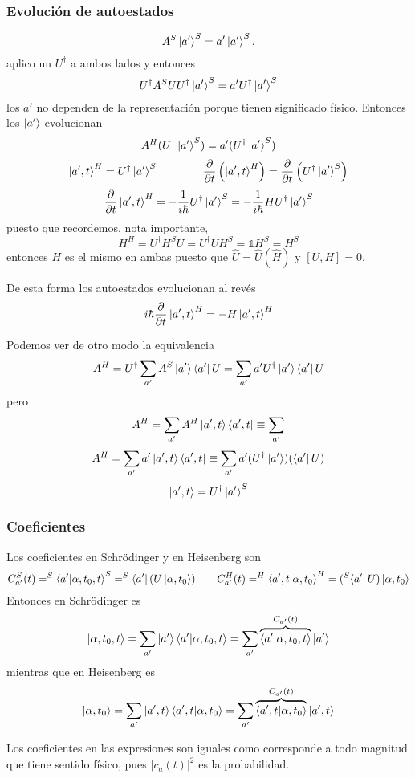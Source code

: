 \documentclass[10pt,oneside]{CBFT_book}
\begin{document}
\subsubsection{Evolución de autoestados}

\[
	A^S \Ket{a'}^S = a' \Ket{a'}^S,
\]
aplico un $U^\dagger$ a ambos lados y entonces 
\[
	U^\dagger A^S UU^\dagger \Ket{a'}^S = a' U^\dagger \Ket{a'}^S
\]
los $a'$ no dependen de la representación porque tienen significado físico. Entonces los $\Ket{a'}$ evolucionan
\[
	A^H (U^\dagger\Ket{a'}^S) = a' (U^\dagger\Ket{a'}^S)
\]
\[
	\Ket{a',t}^H = U^\dagger \Ket{a'}^S \qquad \qquad \frac{\partial^{\hspace{-0.05em}} {}}{\partial {t}^{\hspace{-0.05em}}}\left( \Ket{a',t}^H \right) = 
	\frac{\partial^{\hspace{-0.05em}} {}}{\partial {t}^{\hspace{-0.05em}}} \left( U^\dagger \Ket{a'}^S \right)
\]
\[
	\frac{\partial^{\hspace{-0.05em}} {}}{\partial {t}^{\hspace{-0.05em}}}\Ket{a',t}^H = -\frac{1}{i\hbar} U^\dagger \Ket{a'}^S =  -\frac{1}{i\hbar} H U^\dagger 
	\Ket{a'}^S
\]
puesto que recordemos, nota importante,
\[
	H^H = U^\dagger H^S U = U^\dagger U H^S = \mathbb{1}H^S = H^S
\]
entonces $H$ es el mismo en ambas puesto que $\hat{U} =\hat{U}(\hat{H})$ y $[U,H]=0$.

De esta forma los autoestados evolucionan al revés 
\[
	i\hbar \frac{\partial^{\hspace{-0.05em}} {}}{\partial {t}^{\hspace{-0.05em}}} \Ket{a',t}^H = -H\Ket{a',t}^H
\]

Podemos ver de otro modo la equivalencia
\[
	A^H = U^\dagger \sum_{a'} A^S \Ket{a'}\Bra{a'}U = 
	\sum_{a'} a'U^\dagger \Ket{a'}\Bra{a'}U
\]
pero 
\[
	A^H = \sum_{a'} A^H \Ket{a',t}\Bra{a',t} \equiv \sum_{a'}
\]
\[
	A^H = \sum_{a'} a' \Ket{a',t}\Bra{a',t} \equiv \sum_{a'} a'(U^\dagger\Ket{a'})(\Bra{a'}U)
\]
\[
	\Ket{a',t} = U^\dagger\Ket{a'}^S
\]

\subsubsection{Coeficientes}

Los coeficientes en Schrödinger y en Heisenberg son 
\[
	C_{a'}^S(t) = ^S\braket{a'|\alpha,t_0,t}^S = ^S\Bra{a'}(U\Ket{\alpha,t_0}) \qquad 
	C_{a'}^H(t) = ^H\braket{a',t|\alpha,t_0}^H = (^S\Bra{a'}U)\Ket{\alpha,t_0}
\]
Entonces en Schrödinger es 
\[
	\Ket{\alpha,t_0,t} = \sum_{a'} \Ket{a'}\braket{a'|\alpha,t_0,t} = 
	\sum_{a'} \overbrace{\braket{a'|\alpha,t_0,t}}^{C_{a'}(t)}\Ket{a'}
\]
mientras que en Heisenberg es 
\[
	\Ket{\alpha,t_0} = \sum_{a'} \Ket{a',t}\braket{a',t|\alpha,t_0} = 
	\sum_{a'} \overbrace{\braket{a',t|\alpha,t_0}}^{C_{a'}(t)}\Ket{a',t}
\]

Los coeficientes en las expresiones son iguales como corresponde a todo magnitud que tiene sentido físico, pues 
$|c_a(t)|^2$ es la probabilidad.
\end{document}
